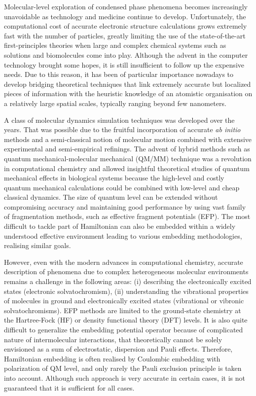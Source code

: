 \documentclass[aip,amsmath,amssymb,reprint]{revtex4-1}
\begin{document}
Molecular\hyp{}level exploration of condensed phase phenomena becomes increasingly unavoidable
as technology and medicine continue to develop. Unfortunately, the computational cost of accurate
electronic structure calculations grows extremely fast with the number of particles, greatly limiting
the use of the state\hyp{}of\hyp{}the\hyp{}art first\hyp{}principles theories 
when large and complex chemical systems such as
solutions and biomolecules come into play. Although the advent in the computer technology 
brought some hopes, it is still insufficient to follow up the expensive needs.
Due to this reason, it has been of particular importance nowadays to develop bridging theoretical techniques that link
extremely accurate but localized pieces of information with the heuristic knowledge of an atomistic organisation 
on a relatively large spatial scales, typically ranging beyond few nanometers. 

A class of molecular dynamics simulation techniques was developed over the years. That was possible
due to the fruitful incorporation of accurate \emph{ab initio} methods and a 
semi\hyp{}classical notion of molecular motion combined with extensive experimental and semi\hyp{}empirical
refinings. The advent of hybrid methods such as quantum mechanical\hyp{}molecular mechanical (QM/MM)
technique was a revolution in computational chemistry and allowed insightful theoretical studies
of quantum mechanical effects in biological systems because the high\hyp{}level 
and costly quantum mechanical calculations
could be combined with low\hyp{}level and cheap classical dynamics. 
The size of quantum level can be extended without compromising accuracy and maintaining good performance
by using vast family of fragmentation methods, such as effective fragment potentials (EFP).
The most difficult to tackle part of Hamiltonian can also be embedded within a widely understood effective environment
leading to various embedding methodologies, realising similar goals.

However, even with the modern advances in computational chemistry, 
accurate description of phenomena due to complex heterogeneous molecular environments 
remains a challenge in the following areas: (i) describing the electronically excited states 
(electronic solvatochromism), (ii) understanding
the vibrational properties of molecules in ground and electronically excited states
(vibrational or vibronic solvatochromisms). EFP methods are limited to the ground\hyp{}state
chemistry at the Hartree\hyp{}Fock (HF) or density functional theory (DFT) levels.
It is also quite difficult to generalize the embedding potential operator
because of complicated nature of intermolecular interactions, that theoretically
cannot be solely envisioned as a sum of electrostatic, dispersion and Pauli effects.
Therefore, Hamiltonian embedding is often realised by Coulombic embedding with polarization
of QM level, and only rarely the Pauli exclusion principle is taken into account. Although
such approach is very accurate in certain cases, it is not guaranteed that it is sufficient
for all cases.
\end{document}
